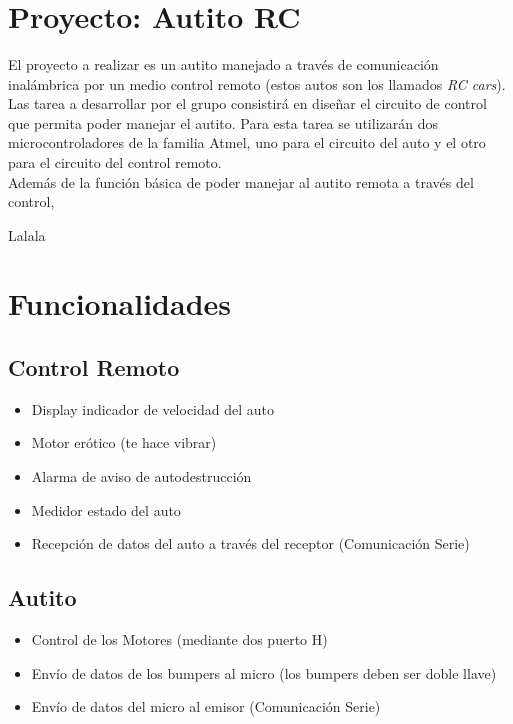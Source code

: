 \documentclass[a4paper,10pt]{article}
\title{  }
\begin{document}
	\maketitle %
	\newpage

	\tableofcontents %
	\newpage

	\section{Proyecto: Autito RC}
		El proyecto a realizar es un autito manejado a través de comunicación inalámbrica por un medio control remoto (estos autos son los llamados \emph{RC cars}).
		Las tarea a desarrollar por el grupo consistirá en diseñar el circuito de control que permita poder manejar el autito. Para esta tarea se utilizarán dos
		microcontroladores de la familia Atmel, uno para el circuito del auto y el otro para el circuito del control remoto. \\
		\indent Además de la función básica de poder manejar al autito remota a través del control, 
		
		\indent Lalala 

	\section{Funcionalidades}
		\subsection{Control Remoto}
			\begin{itemize}
				\item Display indicador de velocidad del auto
				\item Motor erótico (te hace vibrar)
				\item Alarma de aviso de autodestrucción
				\item Medidor estado del auto
				\item Recepción de datos del auto a través del receptor (Comunicación Serie)
			\end{itemize}
		\subsection{Autito}
			\begin{itemize}
				\item Control de los Motores (mediante dos puerto H)
				\item Envío de datos de los bumpers al micro (los bumpers deben ser doble llave)
				\item Envío de datos del micro al emisor (Comunicación Serie)
			\end{itemize}
\end{document}
